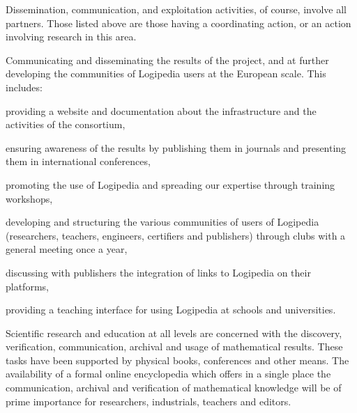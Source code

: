 \begin{workpackage}[id=dissemination,type=MGT,wphases=1-48,
  short={Dissemination},
  title={Dissemination, communication and exploitation},
  lead=Lie,LieRM=3,InrRM=6,BirRM=4,CleRM=2,ImtRM=2,StrRM=2,ZibRM=14,EduRM=12]

  Dissemination, communication, and exploitation activities, of course,
  involve all partners. Those listed above are those having a coordinating
  action, or an action involving research in this area.

  \begin{wpobjectives}
    Communicating and disseminating the
    results of the project, and at further developing the communities
    of Logipedia users at the European scale. This includes:
    \begin{compactitem}
    \item providing a website and documentation about the
      infrastructure and the activities of the consortium,
    \item ensuring awareness of the results by publishing them in
      journals and presenting them in international conferences,
    \item promoting the use of Logipedia and spreading our expertise
      through training workshops,
    \item developing and structuring the various communities of users
      of Logipedia (researchers, teachers, engineers, certifiers and
      publishers) through clubs with a general meeting once a year,
    \item discussing with publishers the integration of links to
      Logipedia on their platforms,
    \item providing a teaching interface for using Logipedia at
      schools and universities.
    \end{compactitem}

    Scientific research and education at all levels are concerned with
    the discovery, verification, communication, archival and usage of
    mathematical results. These tasks have been supported by physical
    books, conferences and other means. The availability of a formal
    online encyclopedia which offers in a single place the
    communication, archival and verification of mathematical knowledge
    will be of prime importance for researchers, industrials, teachers
    and editors.

  \end{wpobjectives}



\end{workpackage}
